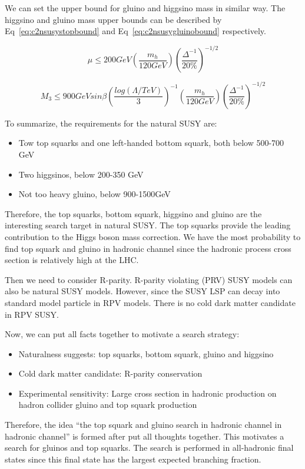 We can set the upper bound for gluino and higgsino mass in similar way\cite{Papucci:2011wy}. The higgsino and gluino mass upper bounds can be described by Eq~\ref{eq:c2nsusystopbound} and Eq~\ref{eq:c2nsusygluinobound} respectively.

\begin{equation}
 \mu \leq 200GeV (\frac{m_{h}}{120GeV})(\frac{\Delta^{-1}}{20\%})^{-1/2}
 \label{eq:c2nsusyhiggsinobound}
\end{equation}

\begin{equation}
 M_{3} \leq 900GeV sin\beta (\frac{log(\Lambda/TeV)}{3})^{-1}(\frac{m_{h}}{120GeV})(\frac{\Delta^{-1}}{20\%})^{-1/2}
 \label{eq:c2nsusygluinobound}
\end{equation}

To summarize, the requirements for the natural SUSY are:
\begin{itemize}
\item Tow top squarks and one left-handed bottom squark, both below 500-700 GeV
\item Two higgsinos, below 200-350 GeV
\item Not too heavy gluino, below 900-1500GeV
\end{itemize}

Therefore, the top squarks, bottom squark, higgsino and gluino are the interesting search target in natural SUSY. The top squarks provide the leading contribution to the Higgs boson mass correction. We have the most probability to find top squark and gluino in hadronic channel since the hadronic process cross section is relatively high at the LHC. 

Then we need to consider R-parity. R-parity violating (PRV) SUSY models can also be natural SUSY models. However, since the SUSY LSP can decay into standard model particle in RPV models. There is no cold dark matter candidate in RPV SUSY. 

Now, we can put all facts together to motivate a search strategy: 
\begin{itemize}
\item Naturalness suggests: top squarks, bottom squark, gluino and higgsino
\item Cold dark matter candidate: R-parity conservation
\item Experimental sensitivity: Large cross section in hadronic production on hadron collider gluino and top squark production
\end{itemize}

Therefore, the idea “the top squark and gluino search in hadronic channel in hadronic channel” is formed after put all thoughts together. This motivates a search for gluinos and top squarks.  The search is performed in all-hadronic final states since this final state has the largest expected branching fraction.

